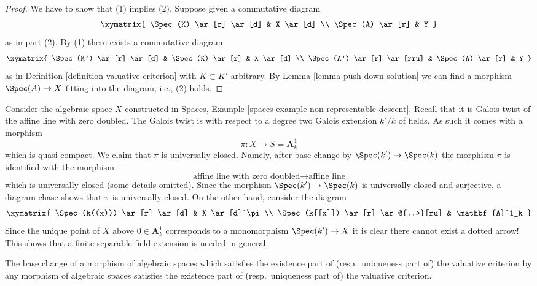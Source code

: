 \begin{proof}
We have to show that (1) implies (2). Suppose given a commutative diagram
$$
\xymatrix{
\Spec(K) \ar[r] \ar[d] & X \ar[d] \\
\Spec(A) \ar[r] & Y
}
$$
as in part (2). By (1) there exists a commutative diagram
$$
\xymatrix{
\Spec(K') \ar[r] \ar[d] & \Spec(K) \ar[r] & X \ar[d] \\
\Spec(A') \ar[r] \ar[rru] & \Spec(A) \ar[r] & Y
}
$$
as in Definition \ref{definition-valuative-criterion} with $K \subset K'$
arbitrary. By Lemma \ref{lemma-push-down-solution} we can find a morphism
$\Spec(A) \to X$ fitting into the diagram, i.e., (2) holds.
\end{proof}

\begin{example}
\label{example-finite-separable-needed}
Consider the algebraic space $X$ constructed in
Spaces, Example \ref{spaces-example-non-representable-descent}.
Recall that it is Galois twist of the affine line with zero doubled.
The Galois twist is with respect to a degree two Galois extension
$k'/k$ of fields. As such it comes with a morphism
$$
\pi : X \longrightarrow S = \mathbf{A}^1_k
$$
which is quasi-compact. We claim that $\pi$ is universally closed.
Namely, after base change by $\Spec(k') \to \Spec(k)$
the morphism $\pi$ is identified with the morphism
$$
\text{affine line with zero doubled}
\longrightarrow
\text{affine line}
$$
which is universally closed (some details omitted). Since the morphism
$\Spec(k') \to \Spec(k)$ is universally closed and
surjective, a diagram chase shows that $\pi$ is universally closed.
On the other hand, consider the diagram
$$
\xymatrix{
\Spec(k((x))) \ar[r] \ar[d] & X \ar[d]^\pi \\
\Spec(k[[x]]) \ar[r] \ar@{..>}[ru] & \mathbf{A}^1_k
}
$$
Since the unique point of $X$ above $0 \in \mathbf{A}^1_k$
corresponds to a monomorphism $\Spec(k') \to X$
it is clear there cannot exist a dotted arrow! This shows that
a finite separable field extension is needed in general.
\end{example}

\begin{lemma}
\label{lemma-base-change-valuative-criteria}
The base change of a morphism of algebraic spaces which satisfies the
existence part of (resp.\ uniqueness part of) the valuative criterion
by any morphism of algebraic spaces satisfies the
existence part of (resp.\ uniqueness part of) the valuative criterion.
\end{lemma}

